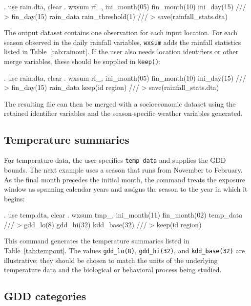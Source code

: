 \begin{stlog}
	. use rain.dta, clear
	. wxsum rf_, ini_month(05) fin_month(10) ini_day(15) ///
	>     fin_day(15) rain_data rain_threshold(1) ///
	>     save(rainfall_stats.dta)
\end{stlog}

\noindent The output dataset contains one observation for each input location. For each season observed in the daily rainfall variables, \texttt{wxsum} adds the rainfall statistics listed in Table~\ref{tab:rainout}. If the user also needs location identifiers or other merge variables, these should be supplied in \texttt{keep()}:

\begin{stlog}
	. use rain.dta, clear
	. wxsum rf_, ini_month(05) fin_month(10) ini_day(15) ///
	>     fin_day(15) rain_data keep(id region) ///
	>     save(rainfall_stats.dta)
\end{stlog}

\noindent The resulting file can then be merged with a socioeconomic dataset using the retained identifier variables and the season-specific weather variables generated.

\subsection{Temperature summaries}

For temperature data, the user specifies \texttt{temp\_data} and supplies the GDD bounds. The next example uses a season that runs from November to February. As the final month precedes the initial month, the command treats the exposure window as spanning calendar years and assigns the season to the year in which it begins:

\begin{stlog}
	. use temp.dta, clear
	. wxsum tmp_, ini_month(11) fin_month(02) temp_data ///
	>     gdd_lo(8) gdd_hi(32) kdd_base(32) ///
	>     keep(id region)
\end{stlog}

\noindent This command generates the temperature summaries listed in Table~\ref{tab:tempout}. The values \texttt{gdd\_lo(8)}, \texttt{gdd\_hi(32)}, and \texttt{kdd\_base(32)} are illustrative; they should be chosen to match the units of the underlying temperature data and the biological or behavioral process being studied.

\subsection{GDD categories}

